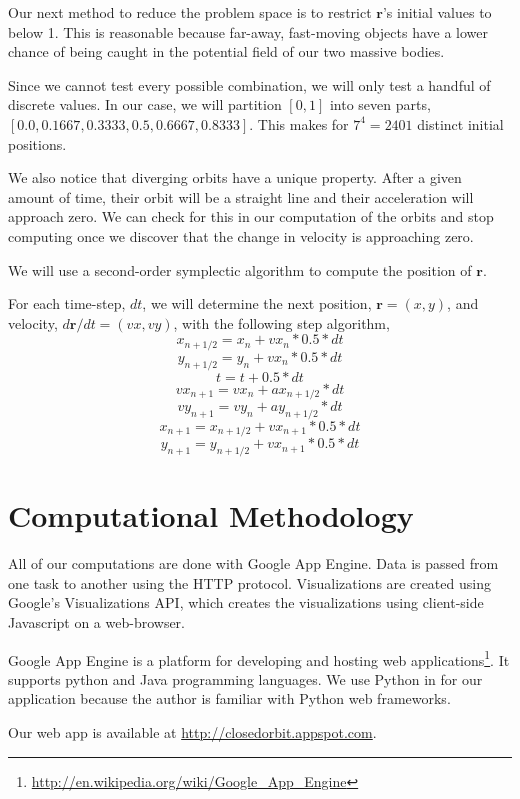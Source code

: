 \documentclass[11pt]{article}
\begin{document}
Our next method to reduce the problem space is to restrict $\mathbf{r}$'s initial values to below 1. This is reasonable because far-away, fast-moving objects have a lower chance of being caught in the potential field of our two massive bodies.

Since we cannot test every possible combination, we will only test a handful of discrete values. In our case, we will partition $[0,1]$ into seven parts, $[0.0, 0.1667, 0.3333, 0.5, 0.6667, 0.8333]$. This makes for $7^4 = 2401$ distinct initial positions.

We also notice that diverging orbits have a unique property. After a given amount of time, their orbit will be a straight line and their acceleration will approach zero. We can check for this in our computation of the orbits and stop computing once we discover that the change in velocity is approaching zero.

We will use a second-order symplectic algorithm to compute the position of $\mathbf{r}$.

For each time-step, $dt$, we will determine the next position, $\mathbf{r} = (x,y)$, and velocity, $d\mathbf{r}/dt = (vx, vy)$, with the following step algorithm,
\[ x_{n+1/2} = x_{n} + vx_{n}*0.5*dt\]
\[ y_{n+1/2} = y_{n} + vx_{n}*0.5*dt\]
\[ t = t + 0.5*dt \]
\[ vx_{n+1} = vx_n + ax_{n+1/2}*dt \]
\[ vy_{n+1} = vy_n + ay_{n+1/2}*dt \]
\[ x_{n+1} = x_{n+1/2} + vx_{n+1}*0.5*dt\]
\[ y_{n+1} = y_{n+1/2} + vx_{n+1}*0.5*dt\]

\section{Computational Methodology}
All of our computations are done with Google App Engine. Data is passed from one task to another using the HTTP protocol. Visualizations are created using Google's Visualizations API, which creates the visualizations using client-side Javascript on a web-browser.

Google App Engine is a platform for developing and hosting web applications\footnote{\url{http://en.wikipedia.org/wiki/Google_App_Engine}}. It supports python and Java programming languages. We use Python in for our application because the author is familiar with Python web frameworks.

Our web app is available at \url{http://closedorbit.appspot.com}.
\end{document}
